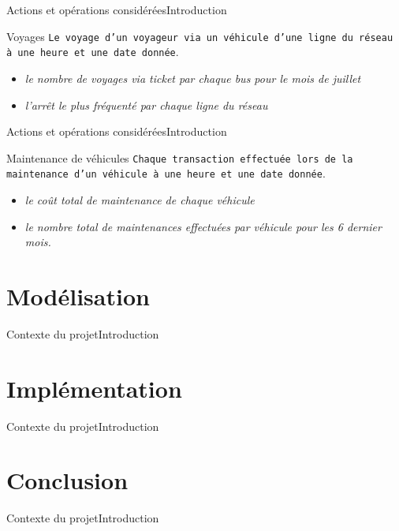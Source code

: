 \documentclass[a4paper,12pt,usenames,dvipsnames]{beamer}
\begin{document}
\begin{frame}{Actions et opérations considérées}{Introduction}
  \begin{block}{Voyages}
    \texttt{Le voyage d'un voyageur via un véhicule d'une ligne du réseau à une heure et une date donnée}.
  \end{block}

  \begin{examples}
    \begin{itemize}
      \item<1-> \textit{le nombre de voyages via ticket par chaque bus pour le mois de juillet}
      \item<2-> \textit{l'arrêt le plus fréquenté par chaque ligne du réseau}
    \end{itemize}
  \end{examples}
\end{frame}

\begin{frame}{Actions et opérations considérées}{Introduction}
  \begin{block}{Maintenance de véhicules}
    \texttt{Chaque transaction effectuée lors de la maintenance d'un véhicule à une heure et une date donnée}.
  \end{block}

  \begin{examples}
    \begin{itemize}
      \item<1-> \textit{le coût total de maintenance de chaque véhicule}
      \item<2-> \textit{le nombre total de maintenances effectuées par véhicule pour les 6 dernier mois.}
    \end{itemize}
  \end{examples}
\end{frame}

\section{Modélisation}
\begin{frame}{Contexte du projet}{Introduction}
\end{frame}

\section{Implémentation}
\begin{frame}{Contexte du projet}{Introduction}
\end{frame}

\section{Conclusion}
\begin{frame}{Contexte du projet}{Introduction}
\end{frame}
\end{document}
